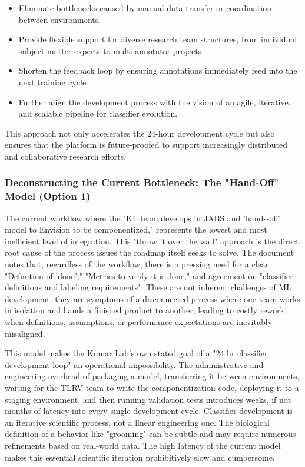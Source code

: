 \documentclass[11pt,onecolumn]{article}
\begin{document}
\begin{itemize}
    \item Eliminate bottlenecks caused by manual data transfer or coordination between environments.
    \item Provide flexible support for diverse research team structures, from individual subject matter experts to multi-annotator projects.
    \item Shorten the feedback loop by ensuring annotations immediately feed into the next training cycle.
    \item Further align the development process with the vision of an agile, iterative, and scalable pipeline for classifier evolution.

\end{itemize}

This approach not only accelerates the 24-hour development cycle but also ensures that the platform is future-proofed to support increasingly distributed and collaborative research efforts.

\subsubsection{Deconstructing the Current Bottleneck: The "Hand-Off" Model (Option 1)}

The current workflow where the "KL team develops in JABS and 'hands-off' model to Envision to be componentized," represents the lowest and most inefficient level of integration. This "throw it over the wall" approach is the direct root cause of the process issues the roadmap itself seeks to solve. The document notes that, regardless of the workflow, there is a pressing need for a clear "Definition of 'done'," "Metrics to verify it is done," and agreement on "classifier definitions and labeling requirements". These are not inherent challenges of ML development; they are symptoms of a disconnected process where one team works in isolation and hands a finished product to another, leading to costly rework when definitions, assumptions, or performance expectations are inevitably misaligned.

This model makes the Kumar Lab's own stated goal of a "24 hr classifier development loop" an operational impossibility. The administrative and engineering overhead of packaging a model, transferring it between environments, waiting for the TLRV team to write the componentization code, deploying it to a staging environment, and then running validation tests introduces weeks, if not months of latency into every single development cycle. Classifier development is an iterative scientific process, not a linear engineering one. The biological definition of a behavior like "grooming" can be subtle and may require numerous refinements based on real-world data. The high latency of the current model makes this essential scientific iteration prohibitively slow and cumbersome.
\end{document}
